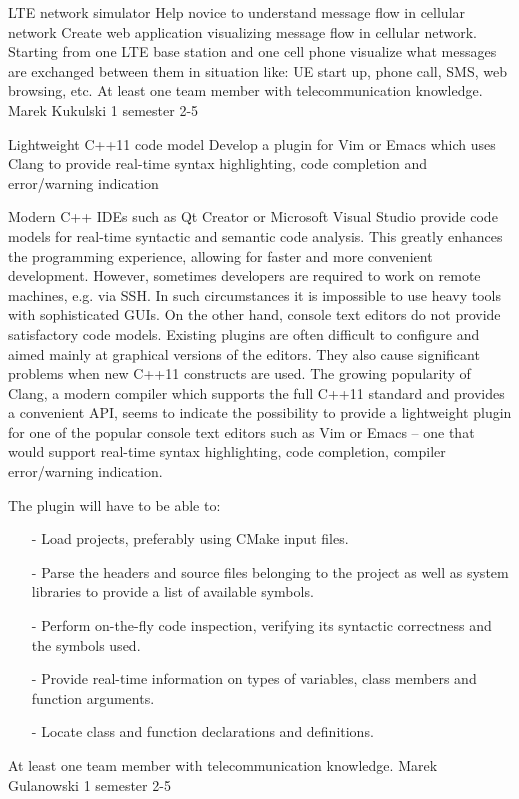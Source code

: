 \begin{project}
{LTE network simulator}
{Help novice to understand message flow in cellular network} 
{ 
Create web application visualizing message flow in cellular network. Starting
from one LTE base station and one cell phone visualize what messages are exchanged between them 
in situation like: UE start up, phone call, SMS, web browsing, etc.
}
{At least one team member with telecommunication knowledge.}
{Marek Kukulski}
{1 semester}
{2-5}
\end{project}
\begin{project}
{Lightweight C++11 code model}
{Develop a plugin for Vim or Emacs which uses Clang to provide real-time
syntax highlighting, code completion and error/warning indication} 
{ 
Modern C++ IDEs such as Qt Creator or Microsoft Visual Studio provide code
models for real-time syntactic and semantic code analysis. This greatly enhances 
the programming experience, allowing for faster and more convenient development. 
However, sometimes developers are required to work on remote machines, e.g. via SSH. 
In such circumstances it is impossible to use heavy tools with sophisticated GUIs. 
On the other hand, console text editors do not provide satisfactory code models. 
Existing plugins are often difficult to configure and aimed mainly at graphical versions of the editors. 
They also cause significant problems when new C++11 constructs are used. The growing popularity of Clang,
a modern compiler which supports the full C++11 standard and provides a convenient API, seems to indicate 
the possibility to provide a lightweight plugin for one of the popular console text editors such as Vim or 
Emacs – one that would support real-time syntax highlighting, code completion, compiler error/warning indication. 
 
The plugin will have to be able to:
\begin{itemize}
	\item[-] Load projects, preferably using CMake input files.
	\item[-] Parse the headers and source files belonging to the project as well as
	system libraries to provide a list of available symbols.
	\item[-] Perform on-the-fly code inspection, verifying its syntactic correctness and the symbols used.
	\item[-] Provide real-time information on types of variables, class members and function arguments.
	\item[-] Locate class and function declarations and definitions.
\end{itemize} 
 }
{At least one team member with telecommunication knowledge.}
{Marek Gulanowski}
{1 semester}
{2-5}
\end{project}
